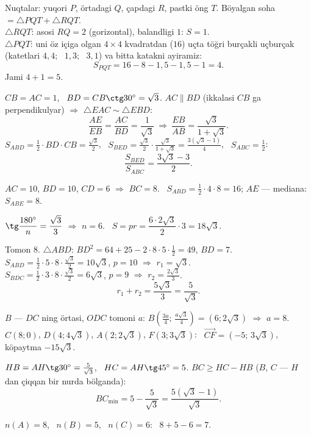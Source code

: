 Nuqtalar: yuqori $P$, örtadagi $Q$, çapdagi $R$, pastki öng $T$. Böyalgan soha $=\triangle PQT+\triangle RQT$.\\
$\triangle RQT$: asosi $RQ=2$ (gorizontal), balandligi $1$: $S=1$.\\
$\triangle PQT$: uni öz içiga olgan $4\times4$ kvadratdan ($16$) uçta töğri burçakli uçburçak (katetlari $4,4$; \ $1,3$; \ $3,1$) va bitta katakni ayiramiz:
\[S_{PQT}=16-8-1{,}5-1{,}5-1=4.\]
Jami $4+1=5$.

$CB=AC=1$, \ $BD=CB\ctg30^\circ=\sqrt3$. $AC\parallel BD$ (ikkalasi $CB$ ga perpendikulyar) $\Rightarrow$ $\triangle EAC\sim\triangle EBD$:
\[\frac{AE}{EB}=\frac{AC}{BD}=\frac1{\sqrt3}\ \Rightarrow\ \frac{EB}{AB}=\frac{\sqrt3}{1+\sqrt3}.\]
$S_{ABD}=\frac12\cdot BD\cdot CB=\frac{\sqrt3}2$, \ $S_{BED}=\frac{\sqrt3}2\cdot\frac{\sqrt3}{1+\sqrt3}=\frac{3\left(\sqrt3-1\right)}4$, \ $S_{ABC}=\frac12$:
\[\frac{S_{BED}}{S_{ABC}}=\frac{3\sqrt3-3}2.\]

$AC=10$, $BD=10$, $CD=6$ $\Rightarrow$ $BC=8$. \ $S_{ABD}=\frac12\cdot4\cdot8=16$; $AE$ — mediana: $S_{ABE}=8$.

$\tg\dfrac{180^\circ}n=\dfrac{\sqrt3}3$ $\Rightarrow$ $n=6$. \ $S=pr=\dfrac{6\cdot2\sqrt3}2\cdot3=18\sqrt3$.

Tomon $8$. $\triangle ABD$: $BD^2=64+25-2\cdot8\cdot5\cdot\frac12=49$, $BD=7$.\\
$S_{ABD}=\frac12\cdot5\cdot8\cdot\frac{\sqrt3}2=10\sqrt3$, $p=10$ $\Rightarrow$ $r_1=\sqrt3$.\\
$S_{BDC}=\frac12\cdot3\cdot8\cdot\frac{\sqrt3}2=6\sqrt3$, $p=9$ $\Rightarrow$ $r_2=\frac{2\sqrt3}3$.
\[r_1+r_2=\frac{5\sqrt3}3=\frac5{\sqrt3}.\]

$B$ — $DC$ ning örtasi, $ODC$ tomoni $a$: $B\left(\frac{3a}4;\,\frac{a\sqrt3}4\right)=\left(6;2\sqrt3\right)$ $\Rightarrow$ $a=8$.\\
$C(8;0)$, $D\left(4;4\sqrt3\right)$, $A\left(2;2\sqrt3\right)$, $F\left(3;3\sqrt3\right)$: \ $\overrightarrow{CF}=\left(-5;\,3\sqrt3\right)$, köpaytma $-15\sqrt3$.

$HB=AH\tg30^\circ=\frac5{\sqrt3}$, \ $HC=AH\tg45^\circ=5$. $BC\ge HC-HB$ ($B$, $C$ — $H$ dan çiqqan bir nurda bölganda):
\[BC_{\min}=5-\frac5{\sqrt3}=\frac{5\left(\sqrt3-1\right)}{\sqrt3}.\]

$n(A)=8$, \ $n(B)=5$, \ $n(C)=6$: \ $8+5-6=7$.


